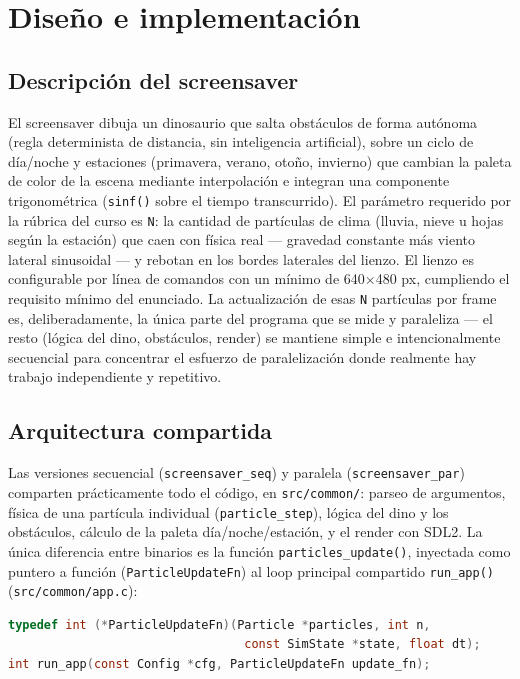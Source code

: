 \documentclass[12pt,letterpaper]{article}
\begin{document}
\section{Diseño e implementación}

\subsection{Descripción del screensaver}

El screensaver dibuja un dinosaurio que salta obstáculos de forma
autónoma (regla determinista de distancia, sin inteligencia artificial),
sobre un ciclo de día/noche y estaciones (primavera, verano, otoño,
invierno) que cambian la paleta de color de la escena mediante
interpolación e integran una componente trigonométrica
(\texttt{sinf()} sobre el tiempo transcurrido). El parámetro requerido
por la rúbrica del curso es \texttt{N}: la cantidad de partículas de
clima (lluvia, nieve u hojas según la estación) que caen con física real
--- gravedad constante más viento lateral sinusoidal --- y rebotan en los
bordes laterales del lienzo. El lienzo es configurable por línea de
comandos con un mínimo de 640$\times$480 px, cumpliendo el requisito
mínimo del enunciado. La actualización de esas \texttt{N} partículas por
frame es, deliberadamente, la única parte del programa que se mide y
paraleliza --- el resto (lógica del dino, obstáculos, render) se mantiene
simple e intencionalmente secuencial para concentrar el esfuerzo de
paralelización donde realmente hay trabajo independiente y repetitivo.

\subsection{Arquitectura compartida}

Las versiones secuencial (\texttt{screensaver\_seq}) y paralela
(\texttt{screensaver\_par}) comparten prácticamente todo el código, en
\texttt{src/common/}: parseo de argumentos, física de una partícula
individual (\texttt{particle\_step}), lógica del dino y los obstáculos,
cálculo de la paleta día/noche/estación, y el render con SDL2. La única
diferencia entre binarios es la función \texttt{particles\_update()},
inyectada como puntero a función (\texttt{ParticleUpdateFn}) al loop
principal compartido \texttt{run\_app()} (\texttt{src/common/app.c}):

\begin{lstlisting}[language=C,caption={Firma compartida entre la versión seq y par (include/app.h)}]
typedef int (*ParticleUpdateFn)(Particle *particles, int n,
                                 const SimState *state, float dt);
int run_app(const Config *cfg, ParticleUpdateFn update_fn);
\end{lstlisting}
\end{document}
